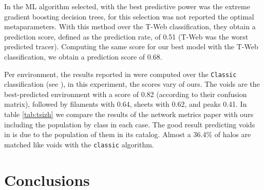 \documentclass[usenatbib]{mnras}
\begin{document}
In \cite{Tsizh2019} the ML algorithm selected, with the best
predictive power was the extreme gradient boosting decision trees, for
this selection was not reported the optimal metaparameters. With this
method over the T-Web classification, they obtain a prediction score,
defined as the prediction rate, of 0.51 (T-Web was the worst predicted
tracer). Computing the same score for our best model with the T-Web
classification, we obtain a prediction score of 0.68. 

Per environment, the results reported in \cite{Tsizh2019} were
computed over the \texttt{Classic} classification (see
\cite{Libeskind2018}), in this experiment, the scores vary of
ours. The voids are the best-predicted environment with a score of
0.82 (according to their confusion matrix), followed by filaments with
0.64, sheets with 0.62, and peaks 0.41. In table \ref{tab:tsizh} we
compare the results of the network metrics paper with ours including
the population by class in each case. The good result predicting voids
in \cite{Tsizh2019} is due to the population of them in its
catalog. Almost a 36.4\% of halos are matched like voids with the
\texttt{classic} algorithm.  


\section{Conclusions}\label{sec:conclusions}
\end{document}
